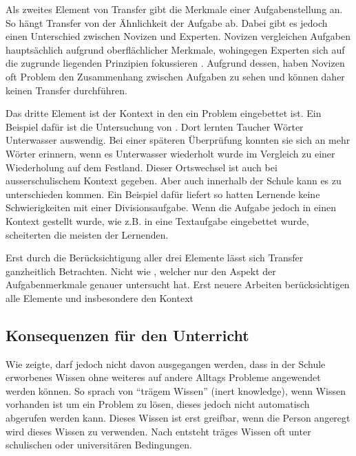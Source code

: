 Als zweites Element von Transfer gibt \citeauthor{Marini1995} die Merkmale einer Aufgabenstellung an. So hängt Transfer von der Ähnlichkeit der Aufgabe ab. Dabei gibt es jedoch einen Unterschied zwischen Novizen und Experten. Novizen vergleichen Aufgaben hauptsächlich aufgrund oberflächlicher Merkmale, wohingegen Experten sich auf die zugrunde liegenden Prinzipien fokussieren \citep[s. S. 279]{Marini1995}. Aufgrund dessen, haben Novizen oft Problem den Zusammenhang zwischen Aufgaben zu sehen und können daher keinen Transfer durchführen.

Das dritte Element ist der Kontext in den ein Problem eingebettet ist. Ein Beispiel dafür ist die Untersuchung von \citet{Godden1975}. Dort lernten Taucher Wörter Unterwasser auswendig. Bei einer späteren Überprüfung konnten sie sich an mehr Wörter erinnern, wenn es Unterwasser wiederholt wurde im Vergleich zu einer Wiederholung auf dem Festland. Dieser Ortswechsel ist auch bei ausserschulischem Kontext gegeben. Aber auch innerhalb der Schule kann es zu unterschieden kommen. Ein Beispiel dafür liefert \citet{Schoenfeld1988} so hatten Lernende keine Schwierigkeiten mit einer Divisionsaufgabe. Wenn die Aufgabe jedoch in einen Kontext gestellt wurde, wie z.B. in eine Textaufgabe eingebettet wurde, scheiterten die meisten der Lernenden. 

Erst durch die Berücksichtigung aller drei Elemente lässt sich Transfer ganzheitlich Betrachten. Nicht wie  \citet{Woodworth1901}, welcher nur den Aspekt der Aufgabenmerkmale genauer untersucht hat. Erst neuere Arbeiten berücksichtigen alle Elemente und insbesondere den Kontext \citep{Lobato2002a, Detterman1993, Greeno1996}

\subsection{Konsequenzen für den Unterricht}
\label{sec:TransferUnterricht}

Wie \citet{claxton1990} zeigte, darf jedoch nicht davon ausgegangen werden, dass in der Schule erworbenes Wissen ohne weiteres auf andere Alltags Probleme angewendet werden können. So sprach \citet{Whitehead1929} von "`trägem Wissen"' (inert knowledge), wenn Wissen vorhanden ist um ein Problem zu lösen, dieses jedoch nicht automatisch abgerufen werden kann. Dieses Wissen ist erst greifbar, wenn die Person angeregt wird dieses Wissen zu verwenden. Nach \citet{Whitehead1929} entsteht träges Wissen oft unter schulischen oder universitären Bedingungen. 



